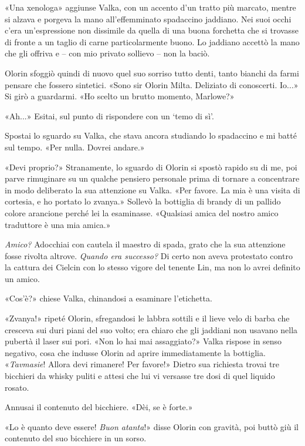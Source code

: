 «Una xenologa» aggiunse Valka, con un accento d'un tratto più marcato,
mentre si alzava e porgeva la mano all'effemminato spadaccino jaddiano.
Nei suoi occhi c'era un'espressione non dissimile da quella di una buona
forchetta che si trovasse di fronte a un taglio di carne particolarmente
buono. Lo jaddiano accettò la mano che gli offriva e -- con mio privato
sollievo -- non la baciò.

Olorin sfoggiò quindi di nuovo quel suo sorriso tutto denti, tanto
bianchi da farmi pensare che fossero sintetici. «Sono sir Olorin Milta.
Deliziato di conoscerti. Io...» Si girò a guardarmi. «Ho scelto un
brutto momento, Marlowe?»

«Ah...» Esitai, sul punto di rispondere con un `temo di sì'.

Spostai lo sguardo su Valka, che stava ancora studiando lo spadaccino e
mi batté sul tempo. «Per nulla. Dovrei andare.»

«Devi proprio?» Stranamente, lo sguardo di Olorin si spostò rapido su di
me, poi parve rimuginare su un qualche pensiero personale prima di
tornare a concentrare in modo deliberato la sua attenzione su Valka.
«Per favore. La mia è una visita di cortesia, e ho portato lo zvanya.»
Sollevò la bottiglia di brandy di un pallido colore arancione perché lei
la esaminasse. «Qualsiasi amica del nostro amico traduttore è una mia
amica.»

\emph{Amico?} Adocchiai con cautela il maestro di spada, grato che la
sua attenzione fosse rivolta altrove. \emph{Quando era successo?} Di
certo non aveva protestato contro la cattura dei Cielcin con lo stesso
vigore del tenente Lin, ma non lo avrei definito un amico.

«Cos'è?» chiese Valka, chinandosi a esaminare l'etichetta.

«Zvanya!» ripeté Olorin, sfregandosi le labbra sottili e il lieve velo
di barba che cresceva sui duri piani del suo volto; era chiaro che gli
jaddiani non usavano nella pubertà il laser sui pori. «Non lo hai mai
assaggiato?» Valka rispose in senso negativo, cosa che indusse Olorin ad
aprire immediatamente la bottiglia. «\emph{Tavmasie}! Allora devi
rimanere! Per favore!» Dietro sua richiesta trovai tre bicchieri da
whisky puliti e attesi che lui vi versasse tre dosi di quel liquido
rosato.

Annusai il contenuto del bicchiere. «Dèi, se è forte.»

«Lo è quanto deve essere! \emph{Buon atanta}!» disse Olorin con gravità,
poi buttò giù il contenuto del suo bicchiere in un sorso.


